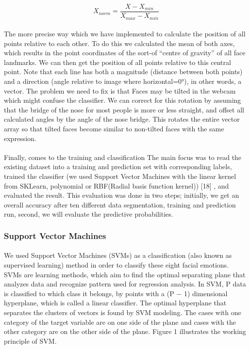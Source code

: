 \documentclass[a4paper,12pt,oneside]{article}
\begin{document}
\[X_{norm}=\frac{X-X_{min}}{X_{max}-X_{min}}\]

\paragraph{}
The more precise way which we have implemented to
calculate the position of all points relative to each other.
To do this we calculated the mean of both axes, which
results in the point coordinates of the sort-of “centre of
gravity” of all face landmarks. We can then get
the position of all points relative to this central
point. Note that each line has both a magnitude (distance
between both points) and a direction (angle relative to
image where horizontal=0°), in other words, a
vector. The problem we need to fix is that Faces may be
tilted in the webcam which might confuse the classifier.
We can correct for this rotation by assuming that the
bridge of the nose for most people is more or less
straight, and offset all calculated angles by the angle of
the nose bridge. This rotates the entire vector array so
that tilted faces become similar to non-tilted faces with
the same expression.

\paragraph{}
Finally, comes to the training and classification The
main focus was to read the existing dataset into a training
and prediction set with corresponding labels, trained the
classifier (we used Support Vector Machines with the
linear kernel from SKLearn, polynomial or RBF(Radial
basis function kernel)) [18] , and evaluated the result.
This evaluation was done in two steps; initially, we get
an overall accuracy after ten different data segmentation,
training and prediction run, second, we will evaluate the
predictive probabilities.

\subsubsection{Support Vector Machines}
\paragraph{}
We used Support Vector Machines (SVMs) as a
classification (also known as supervised learning)
method in order to classify these eight facial emotions.
SVMs are learning methods, which aim to find the
optimal separating plane that analyzes data and
recognize pattern used for regression analysis. In SVM,
P data is classified to which class it belongs, by points
with a (P − 1) dimensional hyperplane, which is called a
linear classifier. The optimal hyperplane that separates
the clusters of vectors is found by SVM modeling. The
cases with one category of the target variable are on one
side of the plane and cases with the other category are on
the other side of the plane. Figure 1 illustrates the
working principle of SVM.
\end{document}
